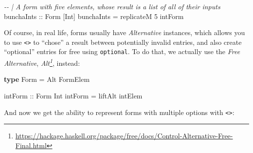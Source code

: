 \documentclass[]{article}
\newenvironment{Shaded}{}{}
\newcommand{\CommentTok}[1]{\textcolor[rgb]{0.38,0.63,0.69}{\textit{#1}}}
\newcommand{\DataTypeTok}[1]{\textcolor[rgb]{0.56,0.13,0.00}{#1}}
\newcommand{\DecValTok}[1]{\textcolor[rgb]{0.25,0.63,0.44}{#1}}
\newcommand{\KeywordTok}[1]{\textcolor[rgb]{0.00,0.44,0.13}{\textbf{#1}}}
\newcommand{\NormalTok}[1]{#1}
\newcommand{\OperatorTok}[1]{\textcolor[rgb]{0.40,0.40,0.40}{#1}}
\newcommand{\OtherTok}[1]{\textcolor[rgb]{0.00,0.44,0.13}{#1}}
\renewcommand{\href}[2]{#2\footnote{\url{#1}}}
\begin{document}
\begin{Shaded}
\begin{Highlighting}[]
\CommentTok{{-}{-} | A form with five elements, whose result is a list of all of their inputs}
\OtherTok{bunchaInts ::} \DataTypeTok{Form}\NormalTok{ [}\DataTypeTok{Int}\NormalTok{]}
\NormalTok{bunchaInts }\OtherTok{=}\NormalTok{ replicateM }\DecValTok{5}\NormalTok{ intForm}
\end{Highlighting}
\end{Shaded}

Of course, in real life, forms usually have \emph{Alternative} instances, which
allows you to use \texttt{\textless{}\textbar{}\textgreater{}} to ``chose'' a
result between potentially invalid entries, and also create ``optional'' entries
for free using \texttt{optional}. To do that, we actually use the \emph{Free
Alternative},
\emph{\href{https://hackage.haskell.org/package/free/docs/Control-Alternative-Free-Final.html}{Alt}},
instead:

\begin{Shaded}
\begin{Highlighting}[]
\KeywordTok{type} \DataTypeTok{Form} \OtherTok{=} \DataTypeTok{Alt} \DataTypeTok{FormElem}

\OtherTok{intForm ::} \DataTypeTok{Form} \DataTypeTok{Int}
\NormalTok{intForm }\OtherTok{=}\NormalTok{ liftAlt intElem}
\end{Highlighting}
\end{Shaded}

And now we get the ability to represent forms with multiple options with
\texttt{\textless{}\textbar{}\textgreater{}}:

\begin{Shaded}
\end{Shaded}
\end{document}
